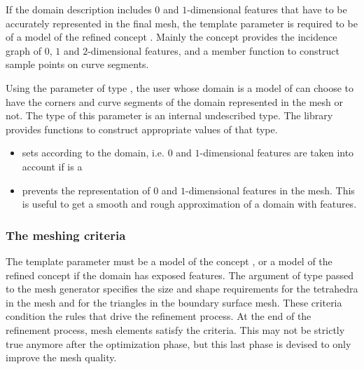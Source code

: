 If the domain description includes $0$ and $1$-dimensional features
that have to be accurately represented in the final mesh,
the  template parameter  is required to be 
of a model of the refined concept
. Mainly 
the concept   provides
 the incidence
graph of $0$, $1$ and $2$-dimensional features,
and  a member function to construct
sample points on curve segments.

Using the parameter of type , the user
whose domain is a model of  
can choose to have the corners and curve segments of the domain
represented in the mesh or not.
The type  of this parameter is an internal undescribed type.
The library provides functions to construct appropriate values of that type.
\begin{itemize}
\item {} sets  according to the domain,
  i.e. $0$ and $1$-dimensional features are taken into account if  is a
\item {} prevents the representation 
of $0$ and $1$-dimensional features in the mesh. This is useful to get a smooth and rough approximation
of a domain with features.
\end{itemize}


\subsubsection{The meshing criteria}
The template parameter  must be a model of the concept
, or a model of  the refined concept 
if the domain has exposed features.
The argument of
type  passed to the mesh generator specifies the
size and shape requirements for the tetrahedra in the mesh
and for the triangles in the boundary surface mesh. These criteria
condition the rules that drive the refinement process.  At the end 
of the refinement process, mesh elements satisfy the criteria.
This may not be strictly true anymore after the optimization phase, but this
last phase is devised to only improve the mesh quality.

